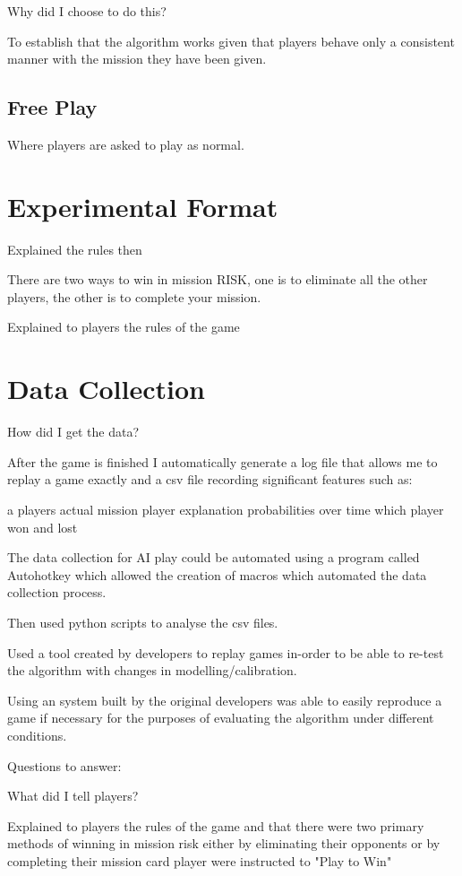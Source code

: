\documentclass[parskip]{cs4rep}
\begin{document}
Why did I choose to do this?

To establish that the algorithm works given that players behave only a consistent manner with the mission they have been given.

\subsection{Free Play}

Where players are asked to play as normal.

\section{Experimental Format}

Explained the rules then

There are two ways to win in mission RISK, one is to eliminate all the other players, the other is to complete your mission.

Explained to players the rules of the game 

\section{Data Collection}

How did I get the data?

After the game is finished I automatically generate a log file that allows me to replay a game exactly and a csv file recording significant features such as:

a players actual mission
player explanation probabilities over time
which player won and lost

The data collection for AI play could be automated using a program called Autohotkey which allowed the creation of macros which automated the data collection process. 

Then used python scripts to analyse the csv files.

Used a tool created by developers to replay games in-order to be able to re-test the algorithm with changes in modelling/calibration.

Using an system built by the original developers was able to easily reproduce a game if necessary for the purposes of evaluating the algorithm under different conditions.

Questions to answer:

What did I tell players?

Explained to players the rules of the game and that there were two primary methods of winning in mission risk either by eliminating their opponents or by completing their mission card player were instructed to "Play to Win"
\end{document}
